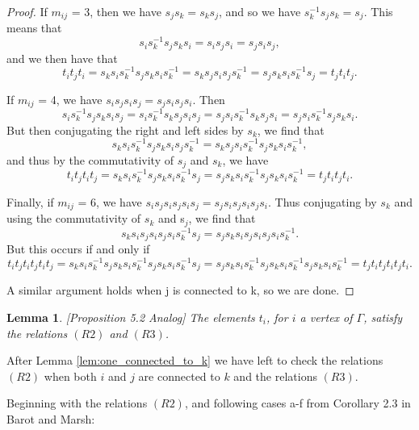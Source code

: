 \documentclass[11pt]{amsart}
\newtheorem{lem}[thm]{Lemma}
\theoremstyle{definition}
\begin{document}
\begin{proof}
If $m_{ij}$ = 3, then we have $s_{j}s_{k} = s_{k}s_{j}$, and so we have $s_{k}^{-1}s_{j}s_{k} = s_{j}.$ This means that $$s_{i}s_{k}^{-1}s_{j}s_{k}s_{i} = s_{i}s_{j}s_{i} = s_{j}s_{i}s_{j},$$ and we then have that $$t_{i}t_{j}t_{i} = s_{k}s_{i}s_{k}^{-1}s_{j}s_{k}s_{i}s_{k}^{-1} = s_{k}s_{j}s_{i}s_{j}s_{k}^{-1} = s_{j}s_{k}s_{i}s_{k}^{-1}s_{j} = t_{j}t_{i}t_{j}.$$

If $m_{ij}$ = 4, we have $s_{i}s_{j}s_{i}s_{j} = s_{j}s_{i}s_{j}s_{i}$. Then $$s_{i}s_{k}^{-1}s_{j}s_{k}s_{i}s_{j} = s_{i}s_{k}^{-1}s_{k}s_{j}s_{i}s_{j} = s_{j}s_{i}s_{k}^{-1}s_{k}s_{j}s_{i} = s_{j}s_{i}s_{k}^{-1}s_{j}s_{k}s_{i}.$$ But then conjugating the right and left sides by $s_{k}$, we find that $$s_{k}s_{i}s_{k}^{-1}s_{j}s_{k}s_{i}s_{j}s_{k}^{-1} = s_{k}s_{j}s_{i}s_{k}^{-1}s_{j}s_{k}s_{i}s_{k}^{-1},$$ and thus by the commutativity of $s_{j}$ and $s_{k}$, we have $$t_{i}t_{j}t_{i}t_{j} = s_{k}s_{i}s_{k}^{-1}s_{j}s_{k}s_{i}s_{k}^{-1}s_{j} = s_{j}s_{k}s_{i}s_{k}^{-1}s_{j}s_{k}s_{i}s_{k}^{-1} = t_{j}t_{i}t_{j}t_{i}.$$

Finally, if $m_{ij}$ = 6, we have $s_{i}s_{j}s_{i}s_{j}s_{i}s_{j} = s_{j}s_{i}s_{j}s_{i}s_{j}s_{i}$. Thus conjugating by $s_{k}$ and using the commutativity of  $s_{k}$ and s$_{j}$, we find that $$s_{k}s_{i}s_{j}s_{i}s_{j}s_{i}s_{k}^{-1}s_{j} = s_{j}s_{k}s_{i}s_{j}s_{i}s_{j}s_{i}s_{k}^{-1}.$$ But this occurs if and only if $$t_{i}t_{j}t_{i}t_{j}t_{i}t_{j} = s_{k}s_{i}s_{k}^{-1}s_{j}s_{k}s_{i}s_{k}^{-1}s_{j}s_{k}s_{i}s_{k}^{-1}s_{j} = s_{j}s_{k}s_{i}s_{k}^{-1}s_{j}s_{k}s_{i}s_{k}^{-1}s_{j}s_{k}s_{i}s_{k}^{-1} = t_{j}t_{i}t_{j}t_{i}t_{j}t_{i}.$$ 

A similar argument holds when j is connected to k, so we are done.
\end{proof} 


\begin{lem}
\label{5.2 analog}
[Proposition 5.2 Analog] The elements $t_i$, for $i$ a vertex of $\Gamma$, satisfy the relations $(R2)$ and $(R3)$.
\end{lem}

After Lemma \ref{lem:one_connected_to_k} we have left to check the relations $(R2)$ when both $i$ and $j$ are connected to $k$ and the relations $(R3)$.


Beginning with the relations $(R2)$, and following cases a-f from Corollary 2.3 in Barot and Marsh:
\end{document}
